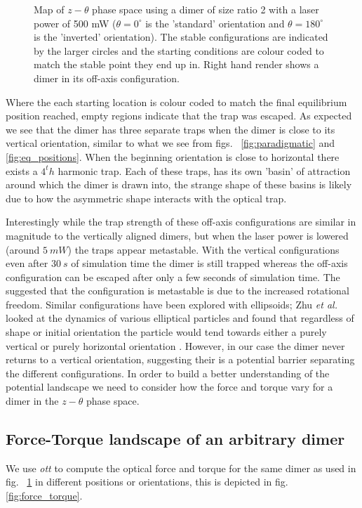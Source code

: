 \begin{figure}[h!]
\begin{subfigure}{0.32\linewidth}
	\end{subfigure}
	\caption{Map of $z-\theta$ phase space using a dimer of size ratio 
		2 with a laser power of 500 mW ($\theta=0^\circ$ is the 
		'standard' orientation and $\theta=180^\circ$ is the 'inverted' 
		orientation). The stable configurations are indicated by the 
		larger circles and the starting conditions are colour coded to 
		match the stable point they end up in. Right hand render shows a 
		dimer in its off-axis configuration.}
	\label{fig:off_axis}
\end{figure}

Where the each starting location is colour coded to
match the final equilibrium position reached, empty
regions indicate that the trap was escaped. As 
expected we see that the dimer has three separate 
traps when the dimer is close to its vertical 
orientation, similar to what we see from figs.~
\ref{fig:paradigmatic} and \ref{fig:eq_positions}. 
When the beginning orientation is close to horizontal 
there exists a $4^th$ harmonic trap. Each of these 
traps, has its own 'basin' of attraction around 
which the dimer is drawn into, the strange shape 
of these basins is likely due to how the asymmetric 
shape interacts with the optical trap.

Interestingly while the trap strength of these off-axis 
configurations are similar in magnitude to the vertically 
aligned dimers, but when the laser power is lowered 
(around $5\ mW$) the traps appear metastable. With the 
vertical configurations even after $30\ s$ of simulation
time the dimer is still trapped whereas the off-axis 
configuration can be escaped after only a few seconds of
simulation time. The suggested that the configuration is 
metastable is due to the increased rotational freedom. 
Similar configurations have been explored with ellipsoids; 
Zhu \textit{et al.} looked at the dynamics of various 
elliptical particles and found that regardless of shape or 
initial orientation the particle would tend towards either 
a purely vertical or purely horizontal orientation 
\cite{Zhu2021}. However, in our case the dimer never returns
to a vertical orientation, suggesting their is a potential 
barrier separating the different configurations. In order
to build a better understanding of the potential landscape 
we need to consider how the force and torque vary for a 
dimer in the $z-\theta$ phase space.  

\subsection{Force-Torque landscape of an arbitrary dimer}
We use \textit{ott} to compute the optical force 
and torque for the same dimer as used in fig.~
\ref{fig:off_axis} in different positions or 
orientations, this is depicted in fig.\ref{fig:force_torque}. 

